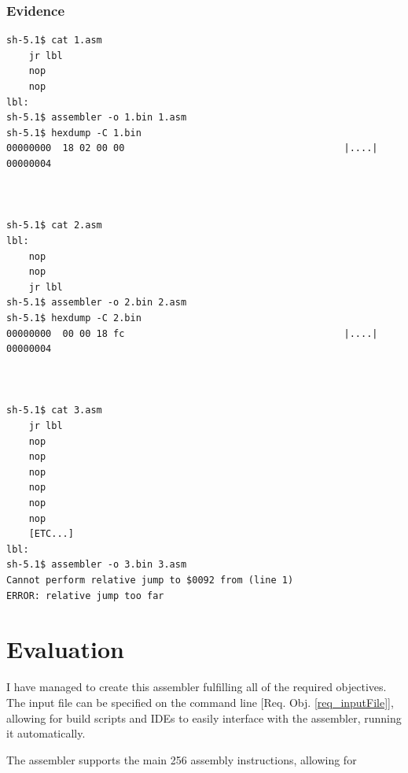 \documentclass[a4paper]{report}
\begin{document}
\begin{table}[H]
\end{table}

\subsection{Evidence}

\begin{lstlisting}
sh-5.1$ cat 1.asm
	jr lbl
	nop
	nop
lbl:
sh-5.1$ assembler -o 1.bin 1.asm
sh-5.1$ hexdump -C 1.bin
00000000  18 02 00 00                                       |....|
00000004



sh-5.1$ cat 2.asm
lbl:
	nop
	nop
	jr lbl
sh-5.1$ assembler -o 2.bin 2.asm
sh-5.1$ hexdump -C 2.bin
00000000  00 00 18 fc                                       |....|
00000004



sh-5.1$ cat 3.asm
	jr lbl
	nop
	nop
	nop
	nop
	nop
	nop
	[ETC...]
lbl:
sh-5.1$ assembler -o 3.bin 3.asm
Cannot perform relative jump to $0092 from (line 1)
ERROR: relative jump too far
\end{lstlisting}

\chapter{Evaluation}

I have managed to create this assembler fulfilling all of the required
objectives. The input file can be specified on the command line [Req. Obj.
\ref{req_inputFile}], allowing for build scripts and IDEs to easily interface
with the assembler, running it automatically.

The assembler supports the main 256 assembly instructions, allowing for 
\end{document}
